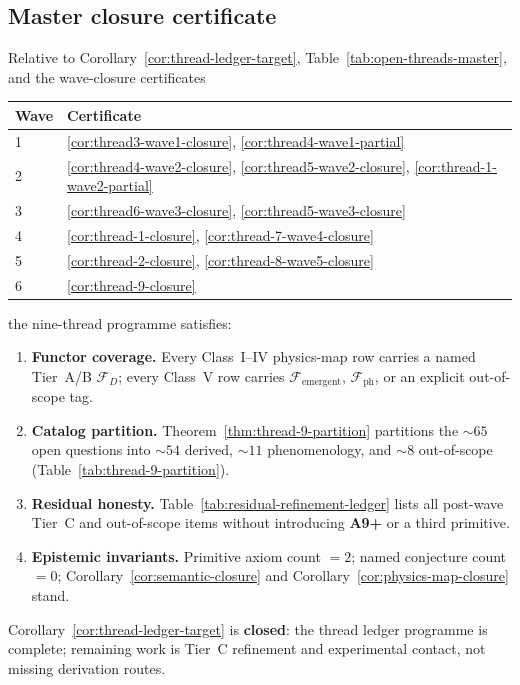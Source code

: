 \subsection{Master closure certificate}
\label{sec:wave6-capstone:closure}

\begin{corollary}
\label{cor:thread-ledger-closure}
Relative to Corollary~\ref{cor:thread-ledger-target},
Table~\ref{tab:open-threads-master}, and the wave-closure certificates
\begin{center}
\small
\begin{tabular}{@{}ll@{}}
\toprule
\textbf{Wave} & \textbf{Certificate} \\
\midrule
1 & \ref{cor:thread3-wave1-closure}, \ref{cor:thread4-wave1-partial} \\
2 & \ref{cor:thread4-wave2-closure}, \ref{cor:thread5-wave2-closure}, \ref{cor:thread-1-wave2-partial} \\
3 & \ref{cor:thread6-wave3-closure}, \ref{cor:thread5-wave3-closure} \\
4 & \ref{cor:thread-1-closure}, \ref{cor:thread-7-wave4-closure} \\
5 & \ref{cor:thread-2-closure}, \ref{cor:thread-8-wave5-closure} \\
6 & \ref{cor:thread-9-closure} \\
\bottomrule
\end{tabular}
\end{center}
the nine-thread programme satisfies:
\begin{enumerate}[label=(\roman*),leftmargin=*]
  \item \textbf{Functor coverage.}
    Every Class~I--IV physics-map row carries a named Tier~A/B $\mathcal{F}_D$;
    every Class~V row carries $\mathcal{F}_{\mathrm{emergent}}$,
    $\mathcal{F}_{\mathrm{ph}}$, or an explicit out-of-scope tag.
  \item \textbf{Catalog partition.}
    Theorem~\ref{thm:thread-9-partition} partitions the $\sim 65$ open questions
    into $\sim 54$ derived, $\sim 11$ phenomenology, and $\sim 8$
    out-of-scope (Table~\ref{tab:thread-9-partition}).
  \item \textbf{Residual honesty.}
    Table~\ref{tab:residual-refinement-ledger} lists all post-wave Tier~C and
    out-of-scope items without introducing \textbf{A9+} or a third primitive.
  \item \textbf{Epistemic invariants.}
    Primitive axiom count $=2$; named conjecture count $=0$;
    Corollary~\ref{cor:semantic-closure} and
    Corollary~\ref{cor:physics-map-closure} stand.
\end{enumerate}
Corollary~\ref{cor:thread-ledger-target} is \textbf{closed}: the thread ledger
programme is complete; remaining work is Tier~C refinement and experimental
contact, not missing derivation routes.
\end{corollary}

